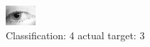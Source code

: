 \begin{figure}[h!]
\begin{center}
\includegraphics[width=0.60\columnwidth]{figures/ID1381_class_4_target_3.png}
\end{center}
\caption{ Classification: 4 actual target: 3}
\label{fig:ID1381_class_4_target_3}
\end{figure}
